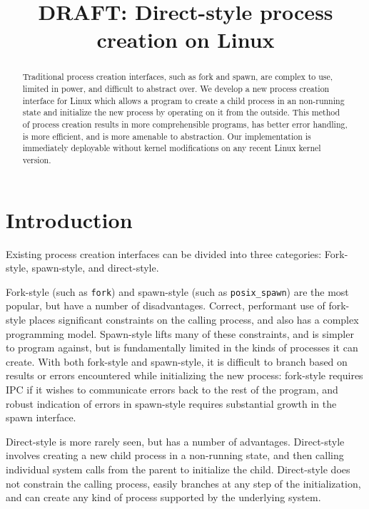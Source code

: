 \documentclass[letterpaper,twocolumn,10pt]{article}
\begin{document}
\date{}
\title{\Large \bf DRAFT: Direct-style process creation on Linux}
\maketitle
\begin{abstract}
Traditional process creation interfaces,
such as fork and spawn,
are complex to use, limited in power, and difficult to abstract over.
We develop a new process creation interface for Linux
which allows a program to create a child process in an non-running state
and initialize the new process by operating on it from the outside.
This method of process creation results in more comprehensible programs, 
has better error handling,
is more efficient,
and is more amenable to abstraction.
Our implementation is immediately deployable without kernel modifications on any recent Linux kernel version.
\end{abstract}

\section{Introduction}\label{introduction}
Existing process creation interfaces can be divided into three categories:
Fork-style, spawn-style, and direct-style.

Fork-style (such as \texttt{fork}) and spawn-style (such as \texttt{posix\_spawn}) are the most popular,
but have a number of disadvantages.
Correct, performant use of fork-style places significant constraints on the calling process,
and also has a complex programming model.
Spawn-style lifts many of these constraints, and is simpler to program against,
but is fundamentally limited in the kinds of processes it can create.
With both fork-style and spawn-style,
it is difficult to
branch based on results or errors encountered while initializing the new process:
fork-style requires IPC if it wishes to communicate errors back to the rest of the program,
and robust indication of errors in spawn-style requires substantial growth in the spawn interface.

Direct-style is more rarely seen, but has a number of advantages.
Direct-style involves creating a new child process in a non-running state,
and then calling individual system calls from the parent to initialize the child.
Direct-style does not constrain the calling process,
easily branches at any step of the initialization,
and can create any kind of process supported by the underlying system.
\end{document}
